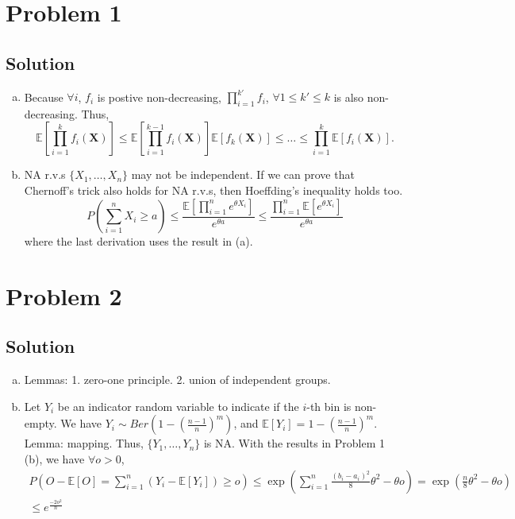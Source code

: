 \documentclass[11pt]{report}
\newcommand{\vect}[1]{\boldsymbol{\mathbf{#1}}}
\newcommand{\E}[1]{\mathbb{E}\left[#1\right]}
\begin{document}

\section*{Problem 1}
\subsection*{Solution}
\begin{enumerate}[(a)]
  \item Because $\forall i$, $f_i$ is postive non-decreasing, $\prod_{i=1}^{k'} f_i$, $\forall 1 \leq k' \leq k$ is also non-decreasing. Thus,
  \[
  \E{\prod_{i=1}^{k} f_i(\vect{X})} \leq \E{\prod_{i=1}^{k-1} f_i(\vect{X})} \E{f_k(\vect{X})} \leq \dots \leq \prod_{i=1}^{k}\E{f_i(\vect{X})}.
  \]
  \item NA r.v.s $\{X_1, \dots, X_n\}$ may not be independent. If we can prove that Chernoff's trick also holds for NA r.v.s, then Hoeffding's inequality holds too.
  \[
    P(\sum_{i=1}^{n} X_i \geq a) \leq \frac{\E{\prod_{i=1}^{n} e^{\theta X_i}}}{e^{\theta a}} \leq \frac{\prod_{i=1}^{n} \E{e^{\theta X_i}}}{e^{\theta a}}
  \]
  where the last derivation uses the result in (a).
\end{enumerate}
\section*{Problem 2}
\subsection*{Solution}
\begin{enumerate}[(a)]
  \item Lemmas: 1. zero-one principle. 2. union of independent groups.
  \item Let $Y_i$ be an indicator random variable to indicate if the $i$-th bin is non-empty. We have $Y_i \sim Ber(1-(\frac{n-1}{n})^m)$, and $\E{Y_i} = 1-(\frac{n-1}{n})^m$. Lemma: mapping. Thus, $\{Y_1, \dots, Y_n\}$ is NA. With the results in Problem 1 (b), we have $\forall o > 0$,
  \begin{multline*}
    P\left(O-\E{O} = \sum_{i=1}^{n} (Y_i - \E{Y_i}) \geq o \right) \leq \exp\left(\sum_{i=1}^{n} \frac{(b_i-a_i)^2}{8}\theta^2 - \theta o \right) = \exp\left(\frac{n}{8} \theta^2 - \theta o \right)\\ \leq e^{\frac{-2 o^2}{n}}
  \end{multline*}
\end{enumerate}
\end{document}
